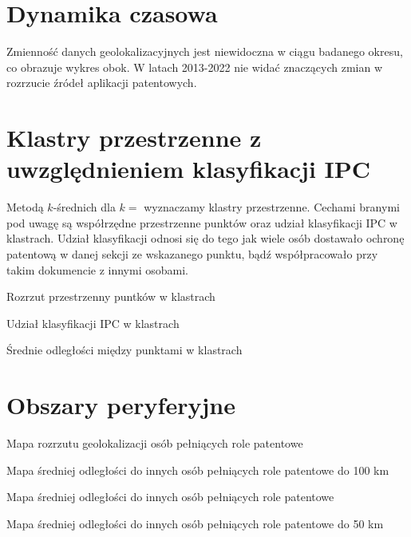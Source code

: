 \section{Dynamika czasowa}

\begin{multicols}{2}

Zmienność danych geolokalizacyjnych jest niewidoczna w ciągu badanego okresu, co obrazuje
wykres obok. W latach 2013-2022 nie widać znaczących zmian w rozrzucie źródeł
aplikacji patentowych.

\columnbreak
{}

\end{multicols}



\section{Klastry przestrzenne z uwzględnieniem klasyfikacji \ac{IPC}}

Metodą $k$-średnich dla $k=$ wyznaczamy klastry przestrzenne. 
Cechami branymi pod uwagę są współrzędne przestrzenne punktów oraz
udział klasyfikacji \ac{IPC} w klastrach. Udział klasyfikacji
odnosi się do tego jak wiele osób dostawało ochronę patentową
w danej sekcji ze wskazanego punktu, bądź współpracowało przy
takim dokumencie z innymi osobami.

\begin{multicols}{2}

{Rozrzut przestrzenny puntków w klastrach}

\columnbreak

{Udział klasyfikacji \ac{IPC} w klastrach}

{Średnie odległości między punktami w klastrach}

\end{multicols}



\section{Obszary peryferyjne}

\begin{multicols}{2}

{Mapa rozrzutu geolokalizacji osób pełniących role patentowe}

{Mapa średniej odległości do innych osób pełniących role patentowe do 100 km}

\columnbreak

{Mapa średniej odległości do innych osób pełniących role patentowe}

{Mapa średniej odległości do innych osób pełniących role patentowe do 50 km}

\end{multicols}

